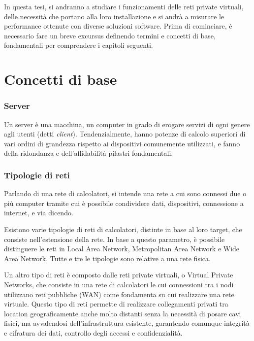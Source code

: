 
In questa tesi, si andranno a studiare i funzionamenti delle reti private virtuali, delle necessità che portano alla loro installazione e si andrà a misurare le performance ottenute con diverse soluzioni software.
Prima di cominciare, è necessario fare un breve excursus definendo termini e concetti di base, fondamentali per comprendere i capitoli seguenti.

\section{Concetti di base}
\subsubsection{Server}
Un server è una macchina, un computer in grado di erogare servizi di ogni genere agli utenti (detti \emph{client}). Tendenzialmente, hanno potenze di calcolo superiori di vari ordini di grandezza rispetto ai dispositivi comunemente utilizzati, e fanno della ridondanza e dell'affidabilità pilastri fondamentali.

\subsubsection{Tipologie di reti}
Parlando di una rete di calcolatori, si intende una rete a cui sono connessi due o più computer tramite cui è possibile condividere dati, dispositivi, connessione a internet, e via dicendo.

Esistono varie tipologie di reti di calcolatori, distinte in base al loro target, che consiste nell'estensione della rete. In base a questo parametro, è possibile distinguere le reti in Local Area Network, Metropolitan Area Network e Wide Area Network. Tutte e tre le tipologie sono relative a una rete fisica.

Un altro tipo di reti è composto dalle reti private virtuali, o Virtual Private Networks, che consiste in una rete di calcolatori le cui connessioni tra i nodi utilizzano reti pubbliche (WAN) come fondamenta su cui realizzare una rete virtuale. Questo tipo di reti permette di realizzare collegamenti privati tra location geograficamente anche molto distanti senza la necessità di posare cavi fisici, ma avvalendosi dell'infrastruttura esistente, garantendo comunque integrità e cifratura dei dati, controllo degli accessi e confidenzialità.

